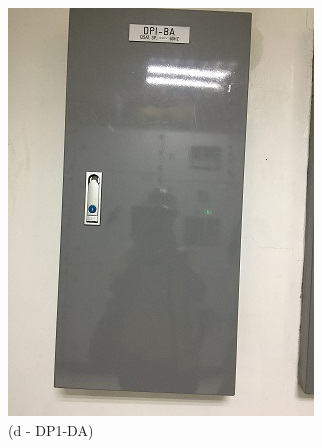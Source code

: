 \begin{figure}
\begin{minipage}[b]{0.22\linewidth}
		\includegraphics[width=\textwidth]{figures/R1P_visual/DP1-BA}
		\caption*{(d - DP1-DA)}	
	\end{minipage}
	\hspace{0.03cm}
	\begin{minipage}[b]{0.22\linewidth}

\end{minipage}
\end{figure}
